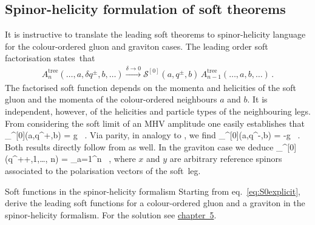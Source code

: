 \subsection{Spinor-helicity formulation of soft theorems}
It is instructive to translate the leading soft theorems to spinor-helicity language for the colour-ordered gluon
and graviton cases. The leading order soft factorisation states~that
\begin{align}
A_{n}^{\text{tree}}(\ldots, a, \delta q^{\pm}, b,\ldots) \stackrel{\delta\to 0}{\longrightarrow}
  \mathcal{S}^{[0]}(a,q^{\pm},b)\, A_{n-1}^{\text{tree}}(\ldots, a,  b,\ldots) \, .
\label{cosoftfactorization}
\end{align}
The factorised soft function depends on the momenta and helicities of the soft gluon and the
momenta of the colour-ordered neighbours $a$ and $b$. It is independent, however,  of 
the helicities and particle types of the neighbouring legs.
From considering the soft limit of an MHV amplitude one easily establishes that
%
\be
 _{}^{[0]}(a,q^{+},b) = g \, .
\ee
%
Via parity, in analogy to , we find
%
\be \label{eq:SoftYM_minus}
_{}^{[0]}(a,q^{-},b) = -g \, .
\ee
%
Both results directly follow from  as well. In the graviton case we deduce
%
\be
{}_{}^{[0]}(q^{++},1,\ldots, n) = \kappa \sum_{a=1}^{n}
\, ,
\ee
%
where $x$ and $y$ are arbitrary reference spinors associated to the polarisation vectors of the soft~leg.


\begin{exer}{Soft functions in the spinor-helicity formalism}
\label{Ex:2.2}
Starting from eq.~\eqref{eq:S0explicit}, derive the leading soft functions for a colour-ordered gluon and a graviton in the spinor-helicity formalism.
For the solution see \hyperref[Sol:2.2]{chapter~5}.
\end{exer}


